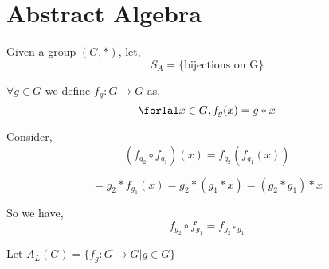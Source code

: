 \chapter{Abstract Algebra}


Given a group $(G, \ast)$, let,  
$$ S_A = \{\text{bijections on G}\} $$ 


$\forall g \in G$ we define $f_g : G \rightarrow G$ as, 
$$ \forlal x \in G, f_g(x) = g\ast x $$ 


Consider, 
$$ (f_{g_2} \circ f_{g_1}) (x) = f_{g_2} (f_{g_1}(x)) $$   

$$ = g_2 \ast f_{g_1}(x) = g_2 \ast (g_1 \ast x)  = (g_2\ast g_1) \ast x$$ 

So we have, 
$$ f_{g_2} \circ f_{g_1} = f_{g_2 \ast g_1} $$ 


Let $A_L(G) = \{f_g : G \rightarrow G | g \in G\}$
